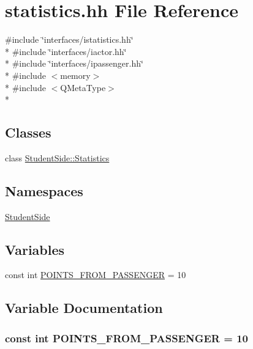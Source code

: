 \hypertarget{statistics_8hh}{\section{statistics.\-hh File Reference}
\label{statistics_8hh}
}
{\ttfamily \#include \char`\"{}interfaces/istatistics.\-hh\char`\"{}}\\*
{\ttfamily \#include \char`\"{}interfaces/iactor.\-hh\char`\"{}}\\*
{\ttfamily \#include \char`\"{}interfaces/ipassenger.\-hh\char`\"{}}\\*
{\ttfamily \#include $<$memory$>$}\\*
{\ttfamily \#include $<$Q\-Meta\-Type$>$}\\*
\subsection*{Classes}
\begin{DoxyCompactItemize}
\item 
class \hyperlink{class_student_side_1_1_statistics}{Student\-Side\-::\-Statistics}
\end{DoxyCompactItemize}
\subsection*{Namespaces}
\begin{DoxyCompactItemize}
\item 
\hyperlink{namespace_student_side}{Student\-Side}
\end{DoxyCompactItemize}
\subsection*{Variables}
\begin{DoxyCompactItemize}
\item 
const int \hyperlink{statistics_8hh_ac9a5f98765234c28f52a4da93922c103}{P\-O\-I\-N\-T\-S\-\_\-\-F\-R\-O\-M\-\_\-\-P\-A\-S\-S\-E\-N\-G\-E\-R} = 10
\end{DoxyCompactItemize}


\subsection{Variable Documentation}
\hypertarget{statistics_8hh_ac9a5f98765234c28f52a4da93922c103}{
\subsubsection[{P\-O\-I\-N\-T\-S\-\_\-\-F\-R\-O\-M\-\_\-\-P\-A\-S\-S\-E\-N\-G\-E\-R}]{\setlength{\rightskip}{0pt plus 5cm}const int P\-O\-I\-N\-T\-S\-\_\-\-F\-R\-O\-M\-\_\-\-P\-A\-S\-S\-E\-N\-G\-E\-R = 10}}\label{statistics_8hh_ac9a5f98765234c28f52a4da93922c103}
